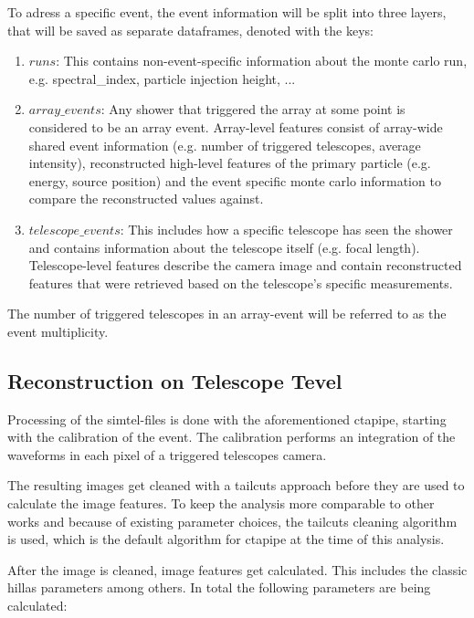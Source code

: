 To adress a specific event, the event information will be split into
three layers, that will be saved as separate dataframes, denoted with the keys:
\begin{enumerate}
    \item{$runs$: This contains non-event-specific information about the monte carlo run, e.g.
    spectral\_index, particle injection height, ...}
    \item{$array\_events$: Any shower that triggered the array at some point 
    is considered to be an array event.
    Array-level features consist of array-wide shared event information 
    (e.g. number of triggered telescopes, average intensity),
    reconstructed high-level features of the primary particle (e.g. energy, source position) and the 
    event specific monte carlo information to compare the reconstructed values against.}
    \item{$telescope\_events$: This includes how a specific telescope has seen the shower and
    contains information about the telescope itself (e.g. focal length). Telescope-level features 
    describe the camera image and contain reconstructed features that were retrieved based on 
    the telescope's specific measurements.}
\end{enumerate}

The number of triggered telescopes in an array-event 
will be referred to as the event multiplicity.

\subsection{Reconstruction on Telescope Tevel}
\label{sec:tel_analysis}

Processing of the simtel-files is done with the aforementioned ctapipe, starting with 
the calibration of the event. The calibration performs an integration of the waveforms in 
each pixel of a triggered telescopes camera. 

The resulting images get cleaned with a tailcuts approach before they are
used to calculate the image features.
To keep the analysis more comparable to other works and because
of existing parameter choices,
the tailcuts cleaning algorithm is used, which is the default algorithm
for ctapipe at the time of this analysis.

After the image is cleaned, image features get calculated.
This includes the classic hillas parameters among others.
In total the following parameters are being calculated:

